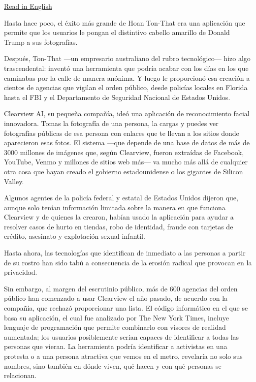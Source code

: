 \href{https://www.nytimes3xbfgragh.onion/2020/01/18/technology/clearview-privacy-facial-recognition.html}{Read
in English}

Hasta hace poco, el éxito más grande de Hoan Ton-That era una aplicación
que permite que los usuarios le pongan el distintivo cabello amarillo de
Donald Trump a sus fotografías.

Después, Ton-That ---un empresario australiano del rubro tecnológico---
hizo algo trascendental: inventó una herramienta que podría acabar con
los días en los que caminabas por la calle de manera anónima. Y luego le
proporcionó esa creación a cientos de agencias que vigilan el orden
público, desde policías locales en Florida hasta el FBI y el
Departamento de Seguridad Nacional de Estados Unidos.

Clearview AI, su pequeña compañía, ideó una aplicación de reconocimiento
facial innovadora. Tomas la fotografía de una persona, la cargas y
puedes ver fotografías públicas de esa persona con enlaces que te llevan
a los sitios donde aparecieron esas fotos. El sistema ---que depende de
una base de datos de más de 3000 millones de imágenes que, según
Clearview, fueron extraídas de Facebook, YouTube, Venmo y millones de
sitios web más--- va mucho más allá de cualquier otra cosa que hayan
creado el gobierno estadounidense o los gigantes de Silicon Valley.

Algunos agentes de la policía federal y estatal de Estados Unidos
dijeron que, aunque solo tenían información limitada sobre la manera en
que funciona Clearview y de quienes la crearon, habían usado la
aplicación para ayudar a resolver casos de hurto en tiendas, robo de
identidad, fraude con tarjetas de crédito, asesinato y explotación
sexual infantil.

Hasta ahora, las tecnologías que identifican de inmediato a las personas
a partir de su rostro han sido tabú a consecuencia de la erosión radical
que provocan en la privacidad.

Sin embargo, al margen del escrutinio público, más de 600 agencias del
orden público han comenzado a usar Clearview el año pasado, de acuerdo
con la compañía, que rechazó proporcionar una lista. El código
informático en el que se basa su aplicación, el cual fue analizado por
The New York Times, incluye lenguaje de programación que permite
combinarlo con visores de realidad aumentada; los usuarios posiblemente
serían capaces de identificar a todas las personas que vieran. La
herramienta podría identificar a activistas en una protesta o a una
persona atractiva que vemos en el metro, revelaría no solo sus nombres,
sino también en dónde viven, qué hacen y con qué personas se relacionan.

